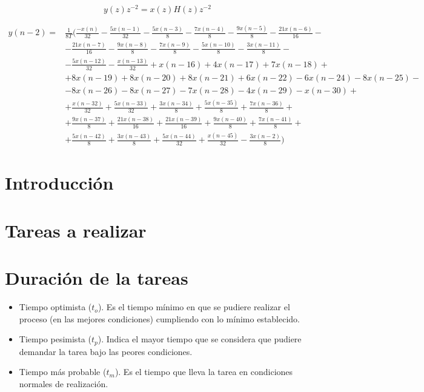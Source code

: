 \documentclass[12pt]{article}
\numberwithin{equation}{section}
\numberwithin{figure}{section}
\numberwithin{table}{section}
\begin{document}
\begin{equation}
y(z) z^{-2} = x(z)H(z) z^{-2}
\end{equation}

\begin{equation}
\begin{split}
y(n-2)= & \frac{1}{8T}(\frac{-x(n)}{32}-\frac{5x(n-1)}{32}-\frac{5x(n-3)}{8}-\frac{7x(n-4)}{8}-\frac{9x(n-5)}{8}-\frac{21x(n-6)}{16}-\\
&-\frac{21x(n-7)}{16}-\frac{9x(n-8)}{8}-\frac{7x(n-9)}{8}-\frac{5x(n-10)}{8}-\frac{3x(n-11)}{8}-\\
&-\frac{5x(n-12)}{32}-\frac{x(n-13)}{32}+x(n-16)+4x(n-17)+7x(n-18)+\\
&+8x(n-19)+8x(n-20)+8x(n-21)+6x(n-22)-6x(n-24)-8x(n-25)-\\
&-8x(n-26)-8x(n-27)-7x(n-28)-4x(n-29)-x(n-30)+\\
&+\frac{x(n-32)}{32}+\frac{5x(n-33)}{32}+\frac{3x(n-34)}{8}+\frac{5x(n-35)}{8}+\frac{7x(n-36)}{8}+\\
&+\frac{9x(n-37)}{8}+\frac{21x(n-38)}{16}+\frac{21x(n-39)}{16}+\frac{9x(n-40)}{8}+\frac{7x(n-41)}{8}+\\
&+\frac{5x(n-42)}{8}+\frac{3x(n-43)}{8}+\frac{5x(n-44)}{32}+\frac{x(n-45)}{32}-\frac{3x(n-2)}{8})
\end{split}
\end{equation}

\section{Introducción}

\section{Tareas a realizar}

\section{Duración de la tareas}

\begin{itemize}
\item Tiempo optimista ($t_o$). Es el tiempo mínimo en que se pudiere realizar
  el proceso (en las mejores condiciones) cumpliendo con lo mínimo establecido.
\item Tiempo pesimista ($t_p$). Indica el mayor tiempo que se considera que
  pudiere demandar la tarea bajo las peores condiciones.
\item Tiempo más probable ($t_m$). Es el tiempo que lleva la tarea en
  condiciones normales de realización.
\end{itemize}
\end{document}
